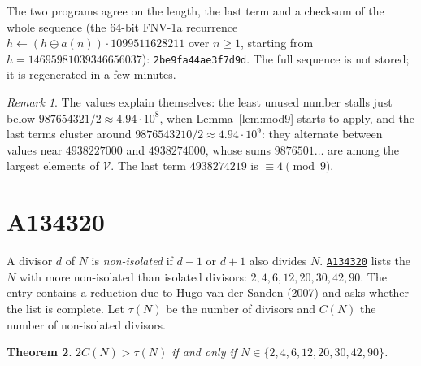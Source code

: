 \documentclass[11pt,a4paper]{article}
\newtheorem{theorem}{Theorem}
\theoremstyle{remark}
\newtheorem{remark}[theorem]{Remark}
\newcommand{\oeis}[1]{\href{https://oeis.org/#1}{\texttt{#1}}}
\begin{document}
The two programs agree on the length, the last term and a checksum of the whole sequence (the 64-bit FNV-1a recurrence $h\leftarrow(h\oplus a(n))\cdot1099511628211$ over $n\ge1$, starting from $h=14695981039346656037$): \texttt{2be9fa44ae3f7d9d}. The full sequence is not stored; it is regenerated in a few minutes.

\begin{remark}
The values explain themselves: the least unused number stalls just below $987654321/2\approx4.94\cdot10^8$, when Lemma~\ref{lem:mod9} starts to apply, and the last terms cluster around $9876543210/2\approx4.94\cdot10^9$: they alternate between values near $4938227000$ and $4938274000$, whose sums $9876501\ldots$ are among the largest elements of $\mathcal V$. The last term $4938274219$ is $\equiv4\pmod9$.
\end{remark}

\section{A134320}\label{sec:134320}

A divisor $d$ of $N$ is \emph{non-isolated} if $d-1$ or $d+1$ also divides $N$. \oeis{A134320} lists the $N$ with more non-isolated than isolated divisors: $2,4,6,12,20,30,42,90$. The entry contains a reduction due to Hugo van der Sanden (2007) and asks whether the list is complete. Let $\tau(N)$ be the number of divisors and $C(N)$ the number of non-isolated divisors.

\begin{theorem}
$2C(N)>\tau(N)$ if and only if $N\in\{2,4,6,12,20,30,42,90\}$.
\end{theorem}
\end{document}

